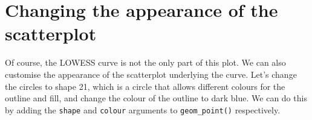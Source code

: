 \documentclass[]{article}
\newenvironment{Shaded}{\begin{snugshade}}{\end{snugshade}}
\newcommand{\KeywordTok}[1]{\textcolor[rgb]{0.13,0.29,0.53}{\textbf{{#1}}}}
\newcommand{\DataTypeTok}[1]{\textcolor[rgb]{0.13,0.29,0.53}{{#1}}}
\newcommand{\DecValTok}[1]{\textcolor[rgb]{0.00,0.00,0.81}{{#1}}}
\newcommand{\FloatTok}[1]{\textcolor[rgb]{0.00,0.00,0.81}{{#1}}}
\newcommand{\CharTok}[1]{\textcolor[rgb]{0.31,0.60,0.02}{{#1}}}
\newcommand{\StringTok}[1]{\textcolor[rgb]{0.31,0.60,0.02}{{#1}}}
\newcommand{\NormalTok}[1]{{#1}}
\begin{document}
\section{Changing the appearance of the
scatterplot}\label{changing-the-appearance-of-the-scatterplot}

Of course, the LOWESS curve is not the only part of this plot. We can
also customise the appearance of the scatterplot underlying the curve.
Let's change the circles to shape 21, which is a circle that allows
different colours for the outline and fill, and change the colour of the
outline to dark blue. We can do this by adding the \texttt{shape} and
\texttt{colour} arguments to \texttt{geom\_point()} respectively.

\begin{Shaded}
\end{Shaded}
\end{document}
